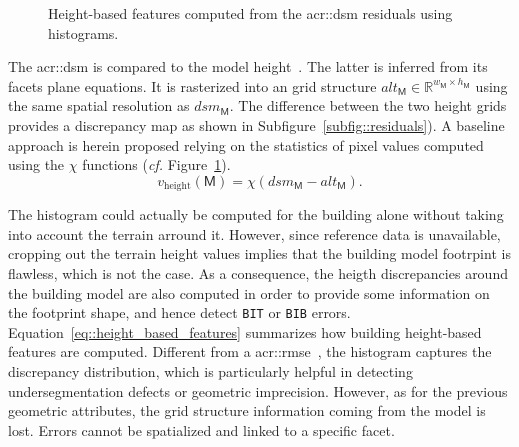         \begin{figure}[htpb]
            \centering
            
            \caption{
                \label{fig::height_based_features}
                Height-based features computed from the \gls{acr::dsm} residuals using histograms.
            }
        \end{figure}

        The \gls{acr::dsm} is compared to the model height~\parencite{bredif20073d,zebedin2008fusion}.
        The latter is inferred from its facets plane equations.
        It is rasterized into an grid structure $alt_{\mathsf{M}} \in \mathbb{R}^{w_{\mathsf{M}} \times h_{\mathsf{M}}}$ using the same spatial resolution as $dsm_{\mathsf{M}}$.
        The difference between the two height grids provides a discrepancy map as shown in Subfigure~\ref{subfig::residuals}).
        A baseline approach is herein proposed relying on the statistics of pixel values computed using the $\chi$ functions (\textit{cf.} Figure~\ref{fig::height_based_features}).\\

        \begin{equation}
            \label{eq::height_based_features}
            v_{\text{height}}\left(\mathsf{M}\right) = \chi \left( dsm_{\mathsf{M}} - alt_{\mathsf{M}} \right).
        \end{equation}

        The histogram could actually be computed for the building alone without taking into account the terrain arround it.
        However, since reference data is unavailable, cropping out the terrain height values implies that the building model footrpint is flawless, which is not the case.
        As a consequence, the heigth discrepancies around the building model are also computed in order to provide some information on the footprint shape, and hence detect \texttt{BIT} or \texttt{BIB} errors.\\

        Equation~\ref{eq::height_based_features} summarizes how building height-based features are computed.
        Different from a \gls{acr::rmse}~\parencite{lafarge2012creating,poullis2013framework}, the histogram captures the discrepancy distribution, which is particularly helpful in detecting undersegmentation defects or geometric imprecision.
        However, as for the previous geometric attributes, the grid structure information coming from the model is lost.
        Errors cannot be spatialized and linked to a specific facet.

